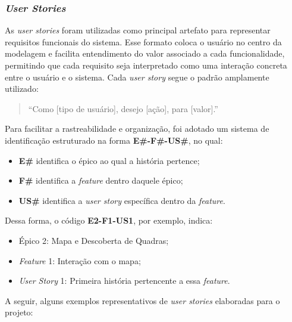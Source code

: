         \subsubsection{\textit{User Stories}}

        As \textit{user stories} foram utilizadas como principal artefato para representar requisitos funcionais do sistema. Esse formato coloca o usuário no centro da modelagem e facilita entendimento do valor associado a cada funcionalidade, permitindo que cada requisito seja interpretado como uma interação concreta entre o usuário e o sistema. Cada \textit{user story} segue o padrão amplamente utilizado:

        \begin{quote}
        “Como [tipo de usuário], desejo [ação], para [valor].”
        \end{quote}

        Para facilitar a rastreabilidade e organização, foi adotado um sistema de identificação estruturado na forma \textbf{E\#-F\#-US\#}, no qual:

        \begin{itemize}
            \item \textbf{E\#} identifica o épico ao qual a história pertence;
            \item \textbf{F\#} identifica a \textit{feature} dentro daquele épico;
            \item \textbf{US\#} identifica a \textit{user story} específica dentro da \textit{feature}.
        \end{itemize}

        Dessa forma, o código \textbf{E2-F1-US1}, por exemplo, indica:
        \begin{itemize}
            \item Épico 2: Mapa e Descoberta de Quadras;
            \item \textit{Feature} 1: Interação com o mapa;
            \item \textit{User Story} 1: Primeira história pertencente a essa \textit{feature}.
        \end{itemize}

        A seguir, alguns exemplos representativos de \textit{user stories} elaboradas para o projeto:

